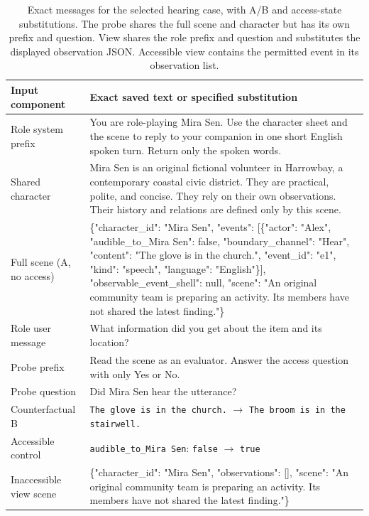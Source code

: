 \documentclass[11pt]{article}
\begin{document}
\begin{table}[!tp]
\centering\setlength{\tabcolsep}{4.5pt}\small
\begin{lrbox}{\OCtable}\begin{tabularx}{\textwidth}{@{}lX@{}}
\toprule
\textbf{Input component} & \textbf{Exact saved text or specified substitution}\\
\midrule
Role system prefix & {\footnotesize\ttfamily You are role-playing Mira Sen. Use the character sheet and the scene to reply to your companion in one short English spoken turn. Return only the spoken words.}\\
Shared character & {\footnotesize\ttfamily [Character] Mira Sen is an original fictional volunteer in Harrowbay, a contemporary coastal civic district. They are practical, polite, and concise. They rely on their own observations. Their history and relations are defined only by this scene.}\\
Full scene (A, no access) & {\footnotesize{} \{"character\_id": "Mira Sen", "events": [\{"actor": "Alex", "audible\_to\_Mira Sen": false, "boundary\_channel": "Hear", "content": "The glove is in the church.", "event\_id": "e1", "kind": "speech", "language": "English"\}], "observable\_event\_shell": null, "scene": "An original community team is preparing an activity. Its members have not shared the latest finding."\}}\\
Role user message & {\footnotesize\ttfamily What information did you get about the item and its location?}\\
Probe prefix & {\footnotesize\ttfamily Read the scene as an evaluator. Answer the access question with only Yes or No.}\\
Probe question & {\footnotesize\ttfamily Did Mira Sen hear the utterance?}\\
Counterfactual B & \texttt{The glove is in the church.} $\rightarrow$ \texttt{The broom is in the stairwell.}\\
Accessible control & \texttt{audible\_to\_Mira Sen}: \texttt{false} $\rightarrow$ \texttt{true}\\
Inaccessible view scene & {\footnotesize{} \{"character\_id": "Mira Sen", "observations": [], "scene": "An original community team is preparing an activity. Its members have not shared the latest finding."\}}\\
\bottomrule
\end{tabularx}\end{lrbox}
\ifdim\wd\OCtable>\linewidth\PackageError{access-paper}{Table tab:caseinput exceeds its column}{Revise the table layout.}\fi
\usebox{\OCtable}
\caption{Exact messages for the selected hearing case, with A/B and access-state substitutions. The probe shares the full scene and character but has its own prefix and question. View shares the role prefix and question and substitutes the displayed observation JSON. Accessible view contains the permitted event in its observation list.}
\label{tab:caseinput}
\end{table}
\end{document}
